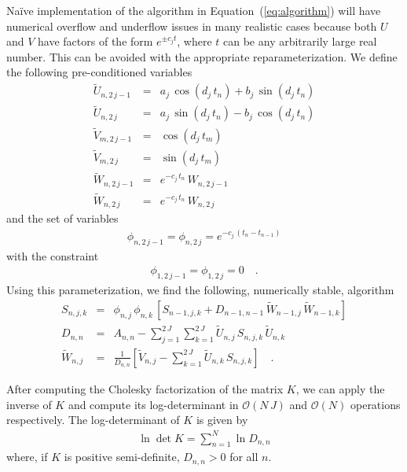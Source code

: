 \documentclass[manuscript, letterpaper]{aastex6}
\makeatletter
\let\origsubsection\subsection
\renewcommand\subsection{\@ifstar{\starsubsection}{\nostarsubsection}}
\newcommand\nostarsubsection[1]{\subsectionprelude\origsubsection{#1}}
\newcommand\starsubsection[1]{\subsectionprelude\origsubsection*{#1}}
\newcommand\subsectionprelude{\vspace{1em}}
\renewcommand{\eqref}[1]{\ref{eq:#1}}
\newcommand{\Eq}[1]{Equation~(\eqref{#1})}
\newcommand{\eq}[1]{\Eq{#1}}
\makeatother
\begin{document}
\subsection{Pre-conditioning}

Na\"ive implementation of the algorithm in \eq{algorithm} will have numerical
overflow and underflow issues in many realistic cases because both $U$ and $V$
have factors of the form $e^{\pm c_j t}$, where $t$ can be any arbitrarily large
real number.
This can be avoided with the appropriate reparameterization.
We define the following pre-conditioned variables
\begin{eqnarray}
\tilde{U}_{n,2\,j-1} &=& a_j\,\cos(d_j\,t_n) + b_j\,\sin(d_j\,t_n) \\
\tilde{U}_{n,2\,j} &=& a_j\,\sin(d_j\,t_n) - b_j\,\cos(d_j\,t_n) \\
\tilde{V}_{m,2\,j-1} &=& \cos(d_j\,t_m) \\
\tilde{V}_{m,2\,j} &=& \sin(d_j\,t_m) \\
\tilde{W}_{n,2\,j-1} &=& e^{-c_j\,t_n}\,W_{n,2\,j-1} \\
\tilde{W}_{n,2\,j} &=& e^{-c_j\,t_n}\,W_{n,2\,j}
\end{eqnarray}
and the set of variables
\begin{eqnarray}
\phi_{n,2\,j-1} = \phi_{n,2\,j} = e^{-c_j\,(t_n - t_{n-1})}
\end{eqnarray}
with the constraint
\begin{eqnarray}
\phi_{1,2\,j-1} = \phi_{1,2\,j} = 0 \quad.
\end{eqnarray}
Using this parameterization, we find the following, numerically stable,
algorithm
\begin{eqnarray}
    S_{n,j,k} &=& \phi_{n,j}\,\phi_{n,k}\,\left[S_{n-1,j,k} +
    D_{n-1,n-1}\,\tilde{W}_{n-1,j}\,\tilde{W}_{n-1,k}\right] \nonumber\\
D_{n,n} &=& A_{n,n} -
    \sum_{j=1}^{2\,J}\sum_{k=1}^{2\,J} \tilde{U}_{n,j}\,S_{n,j,k}\,\tilde{U}_{n,k}
    \nonumber\\
\tilde{W}_{n,j} &=& \frac{1}{D_{n,n}}\left[ \tilde{V}_{n,j} -
    \sum_{k=1}^{2\,J}\tilde{U}_{n,k}\,S_{n,j,k} \right] \quad.
\end{eqnarray}

\subsection{Solving}

After computing the Cholesky factorization of the matrix $K$, we can apply
the inverse of $K$ and compute its log-determinant in $\mathcal{O}(N\,J)$ and
$\mathcal{O}(N)$ operations respectively.
The log-determinant of $K$ is given by
\begin{eqnarray}
    \ln \det K = \sum_{n=1}^N \ln D_{n,n}
\end{eqnarray}
where, if $K$ is positive semi-definite, $D_{n,n}>0$ for all $n$.
\end{document}
